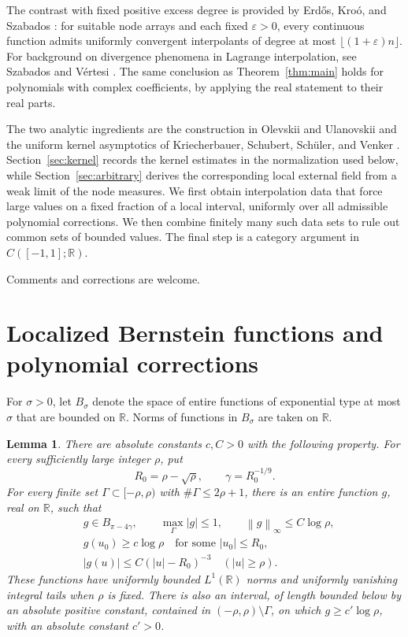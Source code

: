 \documentclass[11pt]{article}
\newtheorem{lemma}[theorem]{Lemma}
\theoremstyle{definition}
\numberwithin{equation}{section}
\newcommand{\R}{\mathbb R}
\newcommand{\norm}[1]{\left\lVert #1\right\rVert}
\begin{document}
The contrast with fixed positive excess degree is provided by Erd\H{o}s,
Kro\'o, and Szabados \cite{EKS89}: for suitable node arrays and each fixed
\(\varepsilon>0\), every continuous function admits uniformly convergent
interpolants of degree at most \(\lfloor(1+\varepsilon)n\rfloor\).
For background on divergence phenomena in Lagrange interpolation, see
Szabados and V\'ertesi \cite{SV90}. The same conclusion as
Theorem~\ref{thm:main} holds for polynomials with complex coefficients,
by applying the real statement to their real parts.

The two analytic ingredients are the construction in
Olevskii and Ulanovskii \cite[Lemma 4.1]{OU} and the uniform kernel
asymptotics of Kriecherbauer, Schubert, Sch\"uler, and Venker
\cite[Theorem 1.3 and Theorem 1.8 (bulk universality)]{KSSV}.
Section~\ref{sec:kernel} records the kernel estimates in the normalization
used below, while Section~\ref{sec:arbitrary} derives the corresponding
local external field from a weak limit of the node measures.
We first obtain interpolation data that force large values on a fixed
fraction of a local interval, uniformly over all admissible polynomial
corrections. We then combine finitely many such data sets to rule out
common sets of bounded values. The final step is a category argument
in \(C([-1,1];\R)\).

Comments and corrections are welcome.

\section{Localized Bernstein functions and polynomial corrections}
\label{sec:bernstein}

For \(\sigma>0\), let \(B_\sigma\) denote the space of entire functions
of exponential type at most \(\sigma\) that are bounded on \(\R\).
Norms of functions in \(B_\sigma\) are taken on \(\R\).

\begin{lemma}\label{lem:bernstein}
There are absolute constants \(c,C>0\) with the following property.
For every sufficiently large integer \(\rho\), put
\[
 R_0=\rho-\sqrt{\rho},
 \qquad \gamma=R_0^{-1/9}.
\]
For every finite set \(\Gamma\subset[-\rho,\rho)\) with
\(\#\Gamma\le2\rho+1\), there is an entire function \(g\), real on
\(\R\), such that
\begin{align}
 &g\in B_{\pi-4\gamma},
 \qquad \max_{\Gamma}|g|\le1,
 \qquad \norm{g}_\infty\le C\log\rho, \label{eq:bernstein-norm}\\
 &g(u_0)\ge c\log\rho
 \quad\text{for some }|u_0|\le R_0, \label{eq:bernstein-peak}\\
 &|g(u)|\le C(|u|-R_0)^{-3}
 \quad (|u|\ge\rho). \label{eq:bernstein-tail}
\end{align}
These functions have uniformly bounded \(L^1(\R)\) norms and uniformly
vanishing integral tails when \(\rho\) is fixed.
There is also an interval, of length bounded below by an absolute
positive constant, contained in \((-\rho,\rho)\setminus\Gamma\), on
which \(g\ge c'\log\rho\), with an absolute constant \(c'>0\).
\end{lemma}
\end{document}
